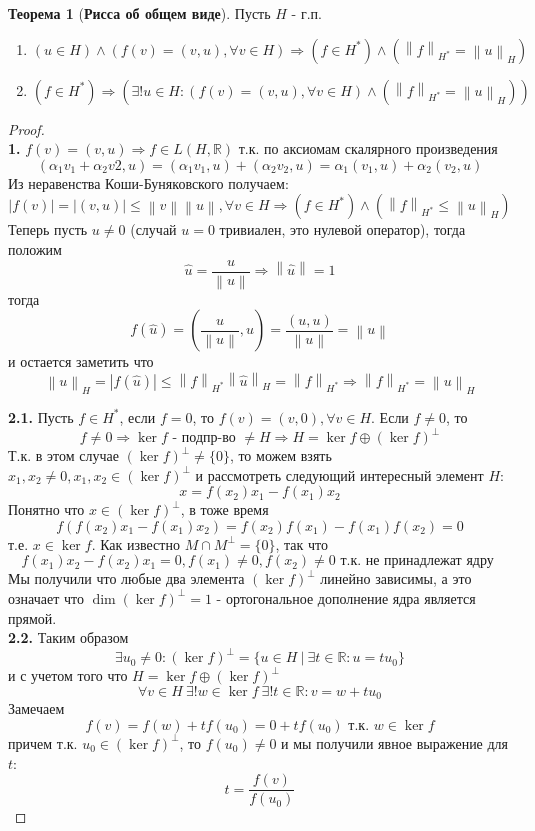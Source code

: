 \documentclass[12pt,a4paper]{article}
\theoremstyle{definition}
\newtheorem{theorem}{Теорема}
\newcommand{\Real}{\mathbb{R}}
\newcommand{\norm}[1]{\left\lVert#1\right\rVert}
\newcommand{\setbuild}[2]{\{#1\:|\:#2\}}
\begin{document}
\begin{theorem}[\textbf{Рисса об общем виде}]\label{th:2} 
	Пусть $H$ - г.п.
	\begin{enumerate}
		\item $(u \in H)\wedge(f(v)=(v,u), \forall v\in H) \Rightarrow (f\in H^*) \wedge (\norm{f}_{H^*}=\norm{u}_H)$
		\item $(f\in H^*)\Rightarrow (\exists! u\in H: (f(v)=(v,u),\forall v\in H)\wedge(\norm{f}_{H^*} = \norm{u}_H))$
	\end{enumerate}
\end{theorem}
\begin{proof}
	$ $ \\
	
	\textbf{1.} $f(v)=(v,u) \Rightarrow f\in L(H,\Real)$ т.к. по аксиомам скалярного произведения 
	$$(\alpha_1 v_1 + \alpha_2 v2, u) = (\alpha_1 v_1, u) + (\alpha_2 v_2, u) = \alpha_1 (v_1, u) + \alpha_2 (v_2, u)$$
	Из неравенства Коши-Буняковского получаем:
	$$|f(v)| = |(v,u)| \leq \norm{v}\norm{u},\forall v\in H \Rightarrow (f\in H^*) \wedge (\norm{f}_{H^*} \leq \norm{u}_H)$$	
	Теперь пусть $u \neq 0$ (случай $u = 0$ тривиален, это нулевой оператор), тогда положим 
	$$\hat{u} = \frac{u}{\norm{u}} \Rightarrow \norm{\hat{u}} = 1$$ 
	тогда $$f(\hat{u}) = (\frac{u}{\norm{u}}, u) = \frac{(u,u)}{\norm{u}} = \norm{u}$$
	и остается заметить что
	$$\norm{u}_H = |f(\hat{u})| \leq \norm{f}_{H^*} \norm{\hat{u}}_H = \norm{f}_{H^*} \Rightarrow \norm{f}_{H^*} = \norm{u}_{H}$$
	\newline
	
	\textbf{2.1.} Пусть $f \in H^*$, если $f = 0$, то $f(v)=(v,0),\forall v \in H$. Если $f \neq 0$, то 
	$$f \neq 0 \Rightarrow \ker{f} \text{ - подпр-во } \neq H \Rightarrow H = \ker{f} \oplus (\ker{f})^\perp$$ 
	Т.к. в этом случае $(\ker{f})^\perp \neq \{0\}$, то можем взять $x_1, x_2 \neq 0, x_1, x_2 \in (\ker{f})^\perp$ и рассмотреть следующий интересный элемент $H$:
	$$x = f(x_2)x_1 - f(x_1)x_2$$
	Понятно что $x \in (\ker{f})^\perp$, в тоже время
	$$f(f(x_2)x_1 - f(x_1)x_2) = f(x_2)f(x_1) - f(x_1)f(x_2) = 0$$ т.е. $x \in \ker{f}$. Как известно $M\cap M^\perp = \{0\}$, так что
	$$f(x_1)x_2 - f(x_2)x_1 = 0, f(x_1) \neq 0, f(x_2) \neq 0 \text{ т.к. не принадлежат ядру }$$
	Мы получили что любые два элемента $(\ker{f})^\perp$ линейно зависимы, а это означает что $\dim{(\ker{f})^\perp} = 1$ - ортогональное дополнение ядра является прямой. \\
	
	\textbf{2.2.} Таким образом $$\exists u_0 \neq 0: (\ker{f})^\perp = \setbuild{u\in H}{\exists t \in \Real: u = t u_0}$$
	и с учетом того что $H = \ker{f} \oplus (\ker{f})^\perp$
	$$\forall v \in H \: \exists!w\in\ker{f} \: \exists!t\in\Real: v = w + tu_0$$ 
	Замечаем
	$$f(v) = f(w) + tf(u_0) = 0 + tf(u_0) \text{ т.к. } w\in\ker{f} $$
	причем т.к. $u_0 \in (\ker{f})^\perp$, то $f(u_0) \neq 0$ и мы получили явное выражение для $t$:
	$$t = \frac{f(v)}{f(u_0)} $$
	

\end{proof}
\end{document}

